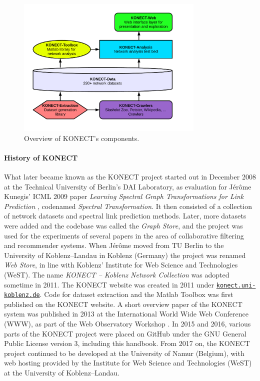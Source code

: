 \documentclass{article}
\newcommand{\wOnePointFive}{0.8\textwidth}
\begin{document}
\begin{figure}
  \centering
  \includegraphics[width=\wOnePointFive]{organization.white}
  \caption{
    \label{fig:organization}
    Overview of KONECT's components. 
  }
\end{figure}

\paragraph{History of KONECT}
What later became known as the KONECT project started out in December 2008 at the Technical University of
Berlin's DAI Laboratory, as evaluation for Jérôme Kunegis' ICML 2009
paper \emph{Learning Spectral Graph Transformations for Link Prediction}
\citep{kunegis:spectral-transformation}, codenamed \emph{Spectral
  Transformation}.  It then consisted of a collection of network
datasets and spectral link prediction methods.  Later, more datasets
were added and the codebase was called the \emph{Graph Store}, and the
project was used for the experiments of several papers in the area of
collaborative filtering and recommender systems.  When Jérôme moved from
TU Berlin to the University of Koblenz--Landau in Koblenz (Germany) the
project was renamed \emph{Web Store}, in line with Koblenz' Institute
for Web Science and Technologies (WeST).  The name \emph{KONECT --
  Koblenz Network Collection} was adopted sometime in 2011.  The KONECT
website was created in 2011 under
\href{http://konect.uni-koblenz.de/}{\texttt{konect.uni-koblenz.de}}.
Code for dataset extraction and the Matlab Toolbox was first published
on the KONECT website.  A short overview paper of the KONECT system was
published in 2013 at the International World Wide Web Conference (WWW),
as part of the Web Observatory Workshop \citep{kunegis:konect}.  In 2015
and 2016, various parts of the KONECT project were placed on GitHub under the GNU
General Public License version 3, including this handbook.  From 2017
on, the KONECT project continued to be developed at the University of
Namur (Belgium), with web hosting provided by the Institute for Web
Science and Technologies (WeST) at the University of
Koblenz--Landau.
\end{document}
